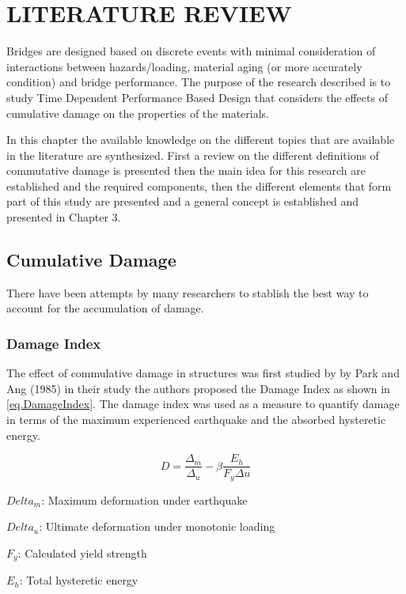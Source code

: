 \chapter{LITERATURE REVIEW}
\label{chap-two}
Bridges are designed based on discrete events with minimal consideration of interactions between hazards/loading, material aging (or more accurately condition) and bridge performance. The purpose of the research described is to study Time Dependent Performance Based Design that considers the effects of cumulative damage on the properties of the materials.

In this chapter the available knowledge on the different topics that are available in the literature are synthesized. First a review on the different definitions of commutative damage is presented then the main idea for this research are established and the required components, then the different elements that form part of this study are presented and  a general concept is established and presented in Chapter 3.

\section{Cumulative Damage}

There have been attempts by many researchers to stablish the best way to account for the accumulation of damage. 

\subsection{Damage Index}
The effect of commulative damage in structures was first studied by by Park and Ang (1985) \cite{Young-JiPark1985} in their study the authors proposed the Damage Index as shown in \ref{eq.DamageIndex}. The damage index was used as a measure to quantify damage in terms of the maximum experienced earthquake and the absorbed hysteretic energy.

\begin{equation}
  D=\frac{\Delta_{m}}{\Delta_{u}}-\beta \frac{E_h}{F_{y}\Delta{u}}
  \label{eq.DamageIndex}
\end{equation} 

$Delta_{m}$: Maximum deformation under earthquake

$Delta_{u}$: Ultimate deformation under monotonic loading

$F_{y}$: Calculated yield strength

$E_{h}$: Total hysteretic energy

